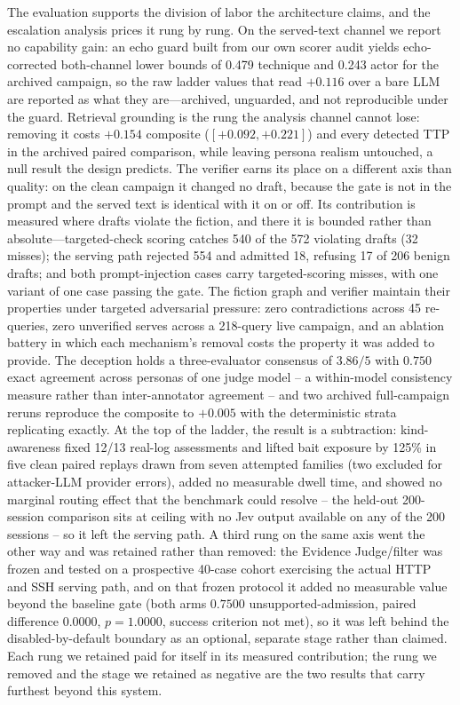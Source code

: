 The evaluation supports the division of labor the architecture claims,
and the escalation analysis prices it rung by rung. On the served-text
channel we report no capability gain: an echo guard built from our own scorer
audit yields echo-corrected both-channel lower bounds of 0.479 technique and 0.243 actor for the archived campaign, so the
raw ladder values that read $+0.116$ over a bare LLM are reported as what
they are---archived, unguarded, and not reproducible under the guard.
Retrieval grounding
is the rung the analysis channel cannot lose: removing
it costs $+0.154$ composite ($[+0.092, +0.221]$) and every detected TTP in
the archived paired comparison,
while leaving persona realism untouched, a null result the design predicts.
The verifier earns its place on a different axis than quality: on the clean
campaign it changed no draft, because the gate is not in the prompt and the
served text is identical with it on or off. Its contribution is measured
where drafts violate the fiction, and there it is bounded rather than
absolute---targeted-check scoring catches 540 of the 572 violating drafts
(32 misses); the serving path rejected 554 and admitted 18, refusing 17 of
206 benign drafts; and both prompt-injection cases carry targeted-scoring
misses, with one variant of one case passing the gate. The fiction graph and verifier maintain their
properties under targeted
adversarial pressure: zero contradictions across 45 re-queries, zero
unverified serves across a 218-query live campaign, and an ablation
battery in which each mechanism's removal costs the property it was added
to provide. The deception holds a three-evaluator consensus of $3.86/5$ with
$0.750$ exact agreement across personas of one judge model -- a
within-model consistency measure rather than inter-annotator agreement
-- and two archived full-campaign reruns reproduce the
composite to $+0.005$ with the deterministic strata replicating exactly.
At the top of the ladder, the result is a subtraction:
kind-awareness fixed 12/13 real-log assessments and lifted bait exposure
by 125\% in five clean paired replays drawn from seven attempted
families (two excluded for attacker-LLM provider errors), added no measurable dwell
time, and showed no marginal routing effect that the benchmark could
resolve -- the held-out 200-session comparison sits at ceiling with no
Jev output available on any of the 200 sessions -- so it left the serving
path.
A third rung on the same axis went the other way and was retained
rather than removed: the Evidence Judge/filter was frozen and tested on
a prospective 40-case cohort exercising the actual HTTP and SSH serving
path, and on that frozen protocol it added no measurable value beyond the
baseline gate (both arms $0.7500$ unsupported-admission, paired
difference $0.0000$, $p=1.0000$, success criterion not met), so it was
left behind the disabled-by-default boundary as an optional, separate
stage rather than claimed. Each rung we retained paid for itself in its
measured contribution; the rung we removed and the stage we retained as
negative are the two results that carry furthest beyond this system.

